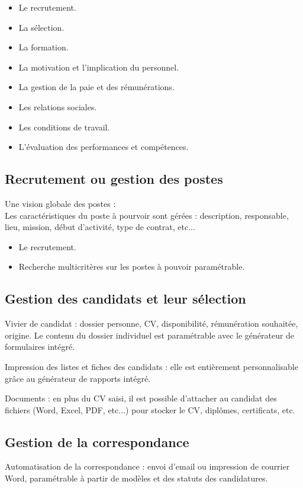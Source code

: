 \begin{itemize}
	\item[\checkmark] Le recrutement.
	\item[\checkmark] La sélection.
	\item[\checkmark] La formation.
	\item[\checkmark] La motivation et l'implication du personnel.
	\item[\checkmark] La gestion de la paie et des rémunérations.
	\item[\checkmark] Les relations sociales.
	\item[\checkmark] Les conditions de travail.
	\item[\checkmark] L'évaluation des performances et compétences.
\end{itemize}

\subsection{Recrutement ou gestion des postes}
Une vision globale des postes : \\
Les caractéristiques du poste à pourvoir sont gérées : description, responsable, lieu, mission, début d'activité, type de contrat, etc...

\begin{itemize}
	\item[\checkmark] Le recrutement.
	\item[\checkmark] Recherche multicritères sur les postes à pouvoir paramétrable.
\end{itemize}

\subsection{Gestion des candidats et leur sélection}
Vivier de candidat : dossier personne, CV, disponibilité, rémunération souhaitée, origine. Le contenu du dossier individuel est paramétrable avec le générateur de formulaires intégré.
\medskip

Impression des listes et fiches des candidats : elle est entièrement personnalisable grâce au générateur de rapports intégré.
\medskip

Documents : en plus du CV saisi, il est possible d'attacher au candidat des fichiers (Word, Excel, PDF, etc...) pour stocker le CV, diplômes, certificats, etc.

\subsection{Gestion de la correspondance}
Automatisation de la correspondance : envoi d'email ou impression de courrier Word, paramétrable à partir de modèles et des statuts des candidatures.
\medskip

